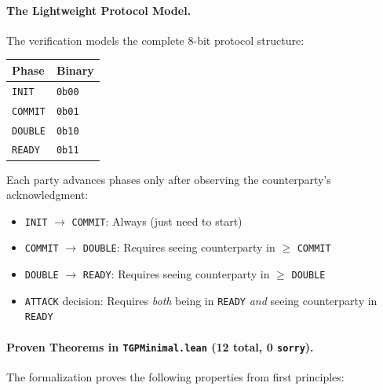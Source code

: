 \paragraph{The Lightweight Protocol Model.}
The verification models the complete 8-bit protocol structure:

\begin{center}
\begin{tabular}{ll}
\toprule
\textbf{Phase} & \textbf{Binary} \\
\midrule
\texttt{INIT} & \texttt{0b00} \\
\texttt{COMMIT} & \texttt{0b01} \\
\texttt{DOUBLE} & \texttt{0b10} \\
\texttt{READY} & \texttt{0b11} \\
\bottomrule
\end{tabular}
\end{center}

Each party advances phases only after observing the counterparty's acknowledgment:
\begin{itemize}
    \item \texttt{INIT} $\to$ \texttt{COMMIT}: Always (just need to start)
    \item \texttt{COMMIT} $\to$ \texttt{DOUBLE}: Requires seeing counterparty in $\geq$ \texttt{COMMIT}
    \item \texttt{DOUBLE} $\to$ \texttt{READY}: Requires seeing counterparty in $\geq$ \texttt{DOUBLE}
    \item \texttt{ATTACK} decision: Requires \emph{both} being in \texttt{READY} \emph{and} seeing counterparty in \texttt{READY}
\end{itemize}

\paragraph{Proven Theorems in \texttt{TGPMinimal.lean} (12 total, 0 \texttt{sorry}).}
The formalization proves the following properties from first principles:

